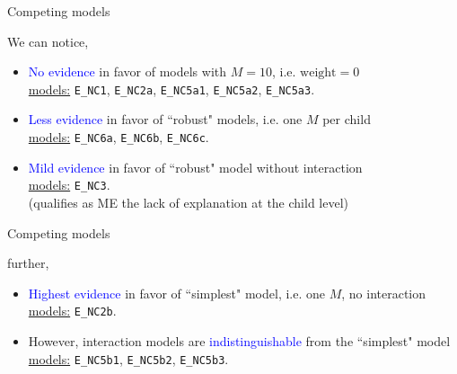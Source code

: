 \begin{comment}
					\node at (0.2,-0.25) {$(-)$}; %
					\draw[dotted, thick] (1.5,1) rectangle (3.5,-1);
					\draw[dashed] (-2.5,2) rectangle (3.7,-1.2);
				\end{tikzpicture}
				\caption*{(a) direct effects}
			\end{figure}
		\end{column}
	\end{columns}
\end{frame}
\end{comment}
%
%
\begin{lhframe}[rhgraphic={\texttt{[image: models\_table.png]}}]
	{Competing models}
	
	We can notice,
	\begin{itemize}
		\item \textcolor{blue}{No evidence} in favor of models with $M=10$, i.e. $\text{weight}=0$ \\
		\underline{models:} \texttt{E\_NC1}, \texttt{E\_NC2a}, \texttt{E\_NC5a1}, \texttt{E\_NC5a2}, \texttt{E\_NC5a3}. 
		\item \textcolor{blue}{Less evidence} in favor of ``robust" models, i.e. one $M$ per child \\
		\underline{models:} \texttt{E\_NC6a}, \texttt{E\_NC6b}, \texttt{E\_NC6c}. 
		\item \textcolor{blue}{Mild evidence} in favor of ``robust" model without interaction \\
		\underline{models:} \texttt{E\_NC3}. \\
		{\small (qualifies as ME the lack of explanation at the child level)} \\
	\end{itemize}
\end{lhframe}
%
%
\begin{lhframe}[rhgraphic={\texttt{[image: models\_table.png]}}]
	{Competing models}
	
	further,
	\begin{itemize}
		\item \textcolor{blue}{Highest evidence} in favor of ``simplest" model, i.e. one $M$, no interaction \\ 
		\underline{models:} \texttt{E\_NC2b}.
		\item However, interaction models are \textcolor{blue}{indistinguishable} from the ``simplest" model \\
		\underline{models:} \texttt{E\_NC5b1}, \texttt{E\_NC5b2}, \texttt{E\_NC5b3}.
	\end{itemize}
\end{lhframe}
